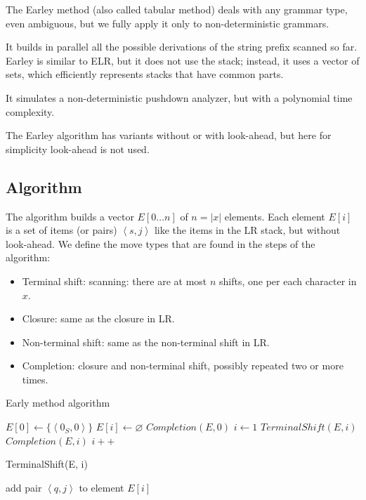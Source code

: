The Earley method (also called tabular method) deals with any grammar type, even ambiguous, but we fully apply it only to non-deterministic grammars. 

It builds in parallel all the possible derivations of the string prefix scanned so far. 
Earley is similar to ELR, but it does not use the stack; instead, it uses a vector of sets, which efficiently represents stacks that have common parts.

It simulates a non-deterministic pushdown analyzer, but with a polynomial time complexity. 

The Earley algorithm has variants without or with look-ahead, but here for simplicity look-ahead is not used. 

\subsection*{Algorithm}
The algorithm builds a vector $E[0\dots n]$ of $n=\left\lvert x \right\rvert$ elements. 
Each element $E[i]$ is a set of items (or pairs) $\left\langle s,j \right\rangle $ like the items in the LR stack, but without look-ahead. 
We define the move types that are found in the steps of the algorithm: 
\begin{itemize}
    \item Terminal shift: scanning: there are at most $n$ shifts, one per each character in $x$. 
    \item Closure: same as the closure in LR. 
    \item Non-terminal shift: same as the non-terminal shift in LR. 
    \item Completion: closure and non-terminal shift, possibly repeated two or more times.
\end{itemize}
\begin{algorithm}[H]
    \caption{Early method algorithm}
        \begin{algorithmic}[1]
            \State $E[0] \leftarrow \{\left\langle 0_S,0 \right\rangle \}$
                \State $E[i] \leftarrow \varnothing$
            \EndFor
            \State $Completion(E,0)$
            \State $i \leftarrow 1$
                \State $TerminalShift(E,i)$
                \State $Completion(E,i)$
                \State $i++$
            \EndWhile 
        \end{algorithmic}
\end{algorithm}
\begin{algorithm}[H]
    \caption{TerminalShift(E, i)}
        \begin{algorithmic}[1]
                \State add pair $\left\langle q,j \right\rangle$ to element $E[i]$
            \EndFor
        \end{algorithmic}
\end{algorithm}
